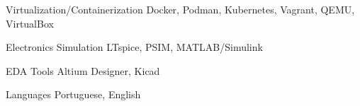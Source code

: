 \begin{cvskills}
  \cvskill
  {Virtualization/Containerization} %
  {Docker, Podman, Kubernetes, Vagrant, QEMU, VirtualBox} %

  \cvskill
  {Electronics Simulation} %
  {LTspice, PSIM, MATLAB/Simulink} %

  \cvskill
  {EDA Tools} %
  {Altium Designer, Kicad} %

  \cvskill
  {Languages} %
  {Portuguese, English} %

\end{cvskills}

